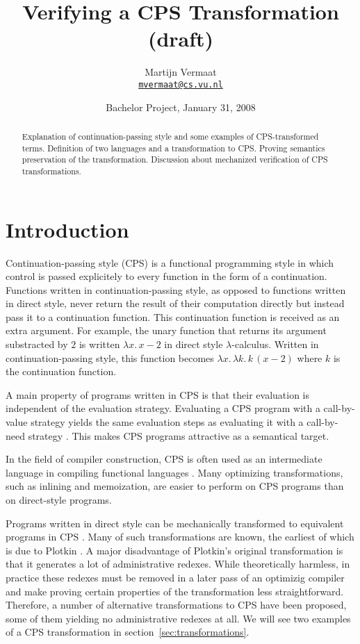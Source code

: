 \documentclass[a4paper,11pt,draft]{article}
\title{\sffamily Verifying a CPS Transformation (draft)}
\author{
  Martijn Vermaat\\[0.3em]
  \href{mailto:mvermaat@cs.vu.nl}{\texttt{mvermaat@cs.vu.nl}}
}
\date{Bachelor Project, January 31, 2008}
\begin{document}
\maketitle


\begin{abstract}
  Explanation of continuation-passing style and some examples of CPS-transformed
  terms. Definition of two languages and a transformation to CPS. Proving
  semantics preservation of the transformation. Discussion about mechanized
  verification of CPS transformations.
\end{abstract}


\section{Introduction}\label{sec:introduction}


Continuation-passing style (CPS) is a functional programming style in which control is
passed explicitely to every function in the form of a continuation. Functions
written in continuation-passing style, as opposed to functions written in direct
style, never return the result of their computation directly but instead pass it to a
continuation function. This continuation function is received as an extra argument.
For example, the unary function that returns its argument
substracted by $2$ is written $\lambda x. \, x - 2$ in direct style
$\lambda$-calculus. Written in continuation-passing style, this function becomes
$\lambda x. \, \lambda k. \, k \, (x - 2)$ where $k$ is the continuation function.

A main property of programs written in CPS is that their evaluation is independent
of the evaluation strategy. Evaluating a CPS program with a call-by-value strategy
yields the same evaluation steps as evaluating it with a call-by-need strategy
\cite{Plotkin-75}. This makes CPS programs attractive as a semantical target.

In the field of compiler construction, CPS is often used as an intermediate language
in compiling functional languages \cite{Appel-92,Orbit-86}. Many optimizing
transformations, such as inlining and memoization, are easier to perform on CPS
programs than on direct-style programs.

Programs written in direct style can be mechanically transformed to equivalent
programs in CPS \cite{Danvy-Filinski-92}. Many of such transformations are known,
the earliest of which is due to Plotkin \cite{Plotkin-75}. A major disadvantage of
Plotkin's original transformation is that it generates a lot of administrative redexes.
While theoretically harmless, in practice these redexes must be removed in a later
pass of an optimizig compiler and make proving certain properties of the transformation
less straightforward. Therefore, a number of alternative transformations to CPS have
been proposed, some of them yielding no administrative redexes at all. We will see two
examples of a CPS transformation in section~\ref{sec:transformations}.
\end{document}
